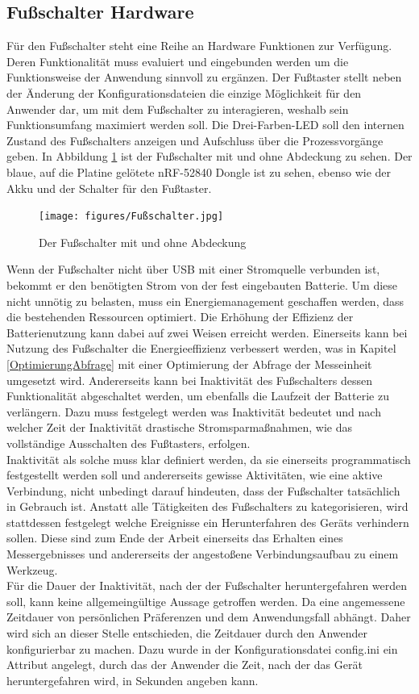 \subsection{Fußschalter Hardware}
Für den Fußschalter steht eine Reihe an Hardware Funktionen zur Verfügung. Deren Funktionalität muss evaluiert und eingebunden werden um die Funktionsweise der Anwendung sinnvoll zu ergänzen. Der Fußtaster stellt neben der Änderung der Konfigurationsdateien die einzige Möglichkeit für den Anwender dar, um mit dem Fußschalter zu interagieren, weshalb sein Funktionsumfang maximiert werden soll. Die Drei-Farben-LED soll den internen Zustand des Fußschalters anzeigen und Aufschluss über die Prozessvorgänge geben. In Abbildung \ref{fig:Fussschalter} ist der Fußschalter mit und ohne Abdeckung zu sehen. Der blaue, auf die Platine gelötete nRF-52840 Dongle ist zu sehen, ebenso wie der Akku und der Schalter für den Fußtaster.
\begin{figure}[H] 
	\centering
	\texttt{[image: figures/Fußschalter.jpg]}
	\caption{Der Fußschalter mit und ohne Abdeckung}
	\label{fig:Fussschalter}
\end{figure}
Wenn der Fußschalter nicht über \ac{USB} mit einer Stromquelle verbunden ist, bekommt er den benötigten Strom von der fest eingebauten Batterie. Um diese nicht unnötig zu belasten, muss ein Energiemanagement geschaffen werden, dass die bestehenden Ressourcen optimiert. Die Erhöhung der Effizienz der Batterienutzung kann dabei auf zwei Weisen erreicht werden. Einerseits kann bei Nutzung des Fußschalter die Energieeffizienz verbessert werden, was in Kapitel \ref{OptimierungAbfrage} mit einer Optimierung der Abfrage der Messeinheit umgesetzt wird. Andererseits kann bei Inaktivität des Fußschalters dessen Funktionalität abgeschaltet werden, um ebenfalls die Laufzeit der Batterie zu verlängern. Dazu muss festgelegt werden was Inaktivität bedeutet und nach welcher Zeit der Inaktivität drastische Stromsparmaßnahmen, wie das vollständige Ausschalten des Fußtasters, erfolgen.\\
Inaktivität als solche muss klar definiert werden, da sie einerseits programmatisch festgestellt werden soll und andererseits gewisse Aktivitäten, wie eine aktive Verbindung, nicht unbedingt darauf hindeuten, dass der Fußschalter tatsächlich in Gebrauch ist. Anstatt alle Tätigkeiten des Fußschalters zu kategorisieren, wird stattdessen festgelegt welche Ereignisse ein Herunterfahren des Geräts verhindern sollen. Diese sind zum Ende der Arbeit einerseits das Erhalten eines Messergebnisses und andererseits der angestoßene Verbindungsaufbau zu einem Werkzeug.\\
Für die Dauer der Inaktivität, nach der der Fußschalter heruntergefahren werden soll, kann keine allgemeingültige Aussage getroffen werden. Da eine angemessene Zeitdauer von persönlichen Präferenzen und dem Anwendungsfall abhängt. Daher wird sich an dieser Stelle entschieden, die Zeitdauer durch den Anwender konfigurierbar zu machen. Dazu wurde in der Konfigurationsdatei config.ini ein Attribut angelegt, durch das der Anwender die Zeit, nach der das Gerät heruntergefahren wird, in Sekunden angeben kann.